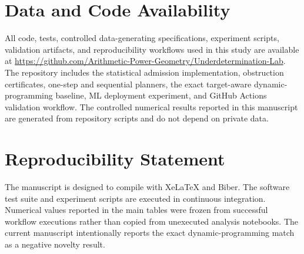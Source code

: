 \documentclass[11pt]{article}
\begin{document}
\section*{Data and Code Availability}
All code, tests, controlled data-generating specifications, experiment scripts, validation artifacts, and reproducibility workflows used in this study are available at \url{https://github.com/Arithmetic-Power-Geometry/Underdetermination-Lab}. The repository includes the statistical admission implementation, obstruction certificates, one-step and sequential planners, the exact target-aware dynamic-programming baseline, ML deployment experiment, and GitHub Actions validation workflow. The controlled numerical results reported in this manuscript are generated from repository scripts and do not depend on private data.

\section*{Reproducibility Statement}
The manuscript is designed to compile with XeLaTeX and Biber. The software test suite and experiment scripts are executed in continuous integration. Numerical values reported in the main tables were frozen from successful workflow executions rather than copied from unexecuted analysis notebooks. The current manuscript intentionally reports the exact dynamic-programming match as a negative novelty result.

\printbibliography
\end{document}
